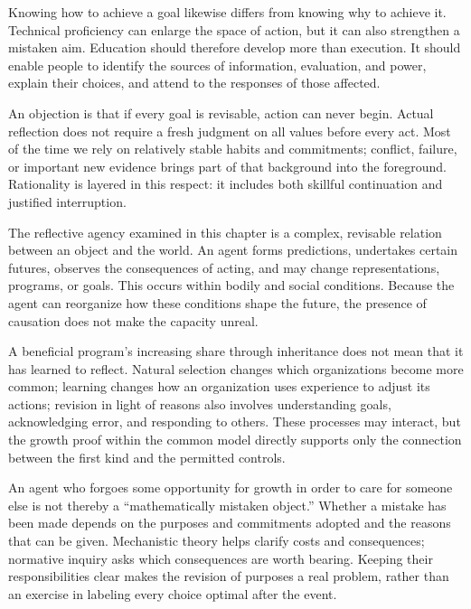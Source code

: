 \documentclass[
  english,
  11pt,
  oneside]{book}
\begin{document}
Knowing how to achieve a goal likewise differs from knowing why to achieve it. Technical proficiency can enlarge the space of action, but it can also strengthen a mistaken aim. Education should therefore develop more than execution. It should enable people to identify the sources of information, evaluation, and power, explain their choices, and attend to the responses of those affected.

An objection is that if every goal is revisable, action can never begin. Actual reflection does not require a fresh judgment on all values before every act. Most of the time we rely on relatively stable habits and commitments; conflict, failure, or important new evidence brings part of that background into the foreground. Rationality is layered in this respect: it includes both skillful continuation and justified interruption.

The reflective agency examined in this chapter is a complex, revisable relation between an object and the world. An agent forms predictions, undertakes certain futures, observes the consequences of acting, and may change representations, programs, or goals. This occurs within bodily and social conditions. Because the agent can reorganize how these conditions shape the future, the presence of causation does not make the capacity unreal.

A beneficial program's increasing share through inheritance does not mean that it has learned to reflect. Natural selection changes which organizations become more common; learning changes how an organization uses experience to adjust its actions; revision in light of reasons also involves understanding goals, acknowledging error, and responding to others. These processes may interact, but the growth proof within the common model directly supports only the connection between the first kind and the permitted controls.

\begingroup{}

An agent who forgoes some opportunity for growth in order to care for someone else is not thereby a ``mathematically mistaken object.'' Whether a mistake has been made depends on the purposes and commitments adopted and the reasons that can be given. Mechanistic theory helps clarify costs and consequences; normative inquiry asks which consequences are worth bearing. Keeping their responsibilities clear makes the revision of purposes a real problem, rather than an exercise in labeling every choice optimal after the event.

\par\endgroup
\end{document}
